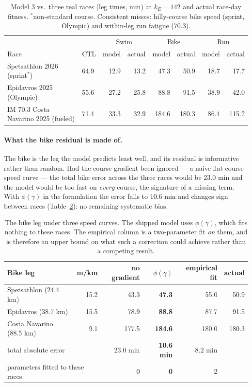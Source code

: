 \documentclass[11pt,a4paper]{article}
\begin{document}
\begin{table}[h]
\centering\small
\begin{tabular}{llrrrrrr}
\toprule
& & \multicolumn{2}{c}{Swim} & \multicolumn{2}{c}{Bike} & \multicolumn{2}{c}{Run}\\
Race & CTL & model & actual & model & actual & model & actual\\
\midrule
Spetsathlon 2026 (sprint$^\ast$) & 64.9 & 12.9 & 13.2 & 47.3 & 50.9 & 18.7 & 17.7\\
Epidavros 2025 (Olympic) & 55.6 & 27.2 & 25.8 & 88.8 & 91.5 & 38.9 & 42.0\\
IM 70.3 Costa Navarino 2025 (fueled) & 71.4 & 33.3 & 32.9 & 184.6 & 180.3 & 86.4 & 115.2\\
\bottomrule
\end{tabular}
\caption{Model 3 vs.\ three real races (leg times, min) at $k_E = 142$ and
actual race-day fitness. $^\ast$non-standard course. Consistent misses:
hilly-course bike speed (sprint, Olympic) and within-leg run fatigue (70.3).}
\label{tab:threeraces}
\end{table}

\paragraph{What the bike residual is made of.} The bike is the leg the model
predicts least well, and its residual is informative rather than random. Had
the course gradient been ignored --- a naive flat-course speed curve --- the
total bike error across the three races would be 23.0 min and the model would
be too fast on \emph{every} course, the signature of a missing term. With
$\phi(\gamma)$ in the formulation the error falls to 10.6 min and changes sign
between races (Table~\ref{tab:gradient}): no remaining systematic bias.

\begin{table}[h]
\centering\small
\begin{tabular}{lrrrrr}
\toprule
Bike leg & m/km & no gradient & $\phi(\gamma)$ & empirical fit & actual\\
\midrule
Spetsathlon (24.4 km) & 15.2 & 43.3 & \textbf{47.3} & 55.0 & 50.9\\
Epidavros (38.7 km) & 15.5 & 78.9 & \textbf{88.8} & 87.7 & 91.5\\
Costa Navarino (88.5 km) & 9.1 & 177.5 & \textbf{184.6} & 180.0 & 180.3\\
\midrule
\multicolumn{2}{l}{total absolute error} & 23.0 min & \textbf{10.6 min} & 8.2 min & \\
\multicolumn{2}{l}{parameters fitted to these races} & 0 & \textbf{0} & 2 & \\
\bottomrule
\end{tabular}
\caption{The bike leg under three speed curves. The shipped model uses
$\phi(\gamma)$, which fits nothing to these races. The empirical column is a
two-parameter fit \emph{on} them, and is therefore an upper bound on what such
a correction could achieve rather than a competing result.}
\label{tab:gradient}
\end{table}
\end{document}
